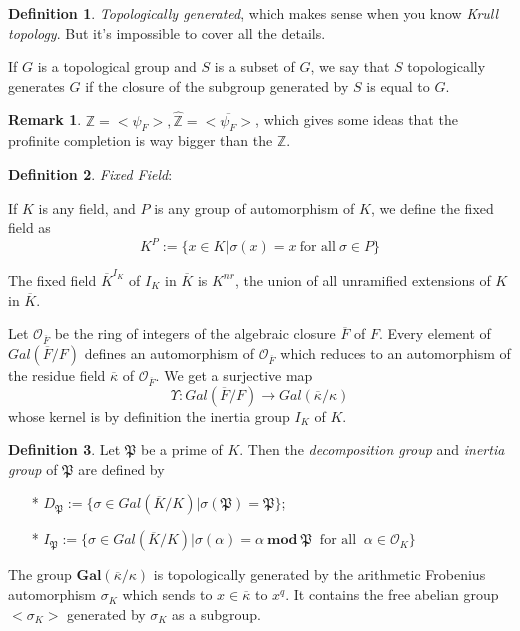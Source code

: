 \documentclass[12pt,a4paper,english]{article}
\theoremstyle{definition}
\newtheorem{defi}{Definition}[section]
\newtheorem*{rem}{Remark}
\theoremstyle{plain}
\begin{document}
\begin{defi}
\emph{Topologically generated}, which makes sense when you know \emph{Krull topology}. But it's impossible to cover all the details.

If $G$ is a topological group and $S$ is a subset of $G$, we say that $S$ topologically generates $G$ if the closure of the subgroup generated by $S$ is equal to $G$.
\end{defi}
\begin{rem}
$\mathbb{Z}=<\psi_{F}>,\hat{\mathbb{Z}}=\overline{<\psi_{F}>}$, which gives some ideas that the profinite completion is way bigger than the $\mathbb{Z}$.
\end{rem}
\begin{defi}
\emph{Fixed Field}:

If $K$ is any field, and $P$ is any group of automorphism of $K$, we define the fixed field as 
\begin{equation*}
    K^{P}:=\{x\in K|\sigma(x)=x\ \text{for all}\ \sigma\in P\}
\end{equation*}

The fixed field $\overline{K}^{I_{K}}$ of $I_{K}$ in $\overline{K}$ is $K^{nr}$, the union of all unramified extensions of $K$ in $\overline{K}$.
\end{defi}
Let $\mathcal{O}_{\overline{F}}$ be the ring of integers of the algebraic closure $\overline{F}$ of $F$. Every element of $Gal(\overline{F}/F)$ defines an automorphism of $\mathcal{O}_{\overline{F}}$ which reduces to an automorphism of the residue field $\overline{\kappa}$ of $\mathcal{O}_{\overline{F}}$. We get a surjective map
\begin{equation*}
     \Upsilon: Gal(\overline{F}/F)\rightarrow Gal(\overline{\kappa}/\kappa) 
\end{equation*}
whose kernel is by definition the inertia group $I_{K}$ of $K$.
\begin{defi}
Let $\mathfrak{P}$ be a prime of $K$. Then the \emph{decomposition group} and \emph{inertia group} of $\mathfrak{P}$ are defined by
\begin{enumerate}
    \item[*] $D_{\mathfrak{P}}:=\{\sigma\in Gal(\overline{K}/K)| \sigma(\mathfrak{P})=\mathfrak{P}\}$;
    \item[*] $I_{\mathfrak{P}}:=\{\sigma\in Gal(\overline{K}/K)| \sigma(\alpha)=\alpha\ \textbf{mod}\ \mathfrak{P}\ \text{ for all }\ \alpha\in\mathcal{O}_{K}\}$
\end{enumerate}
\end{defi}
The group $\textbf{Gal}(\overline{\kappa}/\kappa)$ is topologically generated by the arithmetic Frobenius automorphism $\sigma_{K}$ which sends to $x\in\overline{\kappa}$ to $x^{q}$. It contains the free abelian group $<\sigma_{K}>$ generated by $\sigma_{K}$ as a subgroup.
\end{document}
